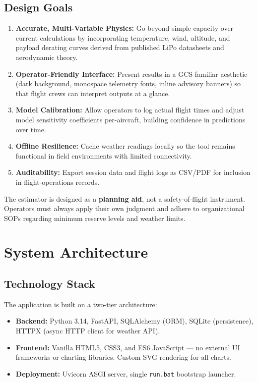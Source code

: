 \documentclass[11pt,a4paper]{article}
\begin{document}
\subsection{Design Goals}
\begin{enumerate}
    \item \textbf{Accurate, Multi-Variable Physics:} Go beyond simple capacity-over-current calculations by incorporating temperature, wind, altitude, and payload derating curves derived from published LiPo datasheets and aerodynamic theory.
    \item \textbf{Operator-Friendly Interface:} Present results in a GCS-familiar aesthetic (dark background, monospace telemetry fonts, inline advisory banners) so that flight crews can interpret outputs at a glance.
    \item \textbf{Model Calibration:} Allow operators to log actual flight times and adjust model sensitivity coefficients per-aircraft, building confidence in predictions over time.
    \item \textbf{Offline Resilience:} Cache weather readings locally so the tool remains functional in field environments with limited connectivity.
    \item \textbf{Auditability:} Export session data and flight logs as CSV/PDF for inclusion in flight-operations records.
\end{enumerate}

\begin{notebox}
    The estimator is designed as a \textbf{planning aid}, not a safety-of-flight instrument. Operators must always apply their own judgment and adhere to organizational SOPs regarding minimum reserve levels and weather limits.
\end{notebox}

\newpage

\section{System Architecture}

\subsection{Technology Stack}
The application is built on a two-tier architecture:

\begin{itemize}[noitemsep]
    \item \textbf{Backend:} Python 3.14, FastAPI, SQLAlchemy (ORM), SQLite (persistence), HTTPX (async HTTP client for weather API).
    \item \textbf{Frontend:} Vanilla HTML5, CSS3, and ES6 JavaScript --- no external UI frameworks or charting libraries. Custom SVG rendering for all charts.
    \item \textbf{Deployment:} Uvicorn ASGI server, single \texttt{run.bat} bootstrap launcher.
\end{itemize}
\end{document}
